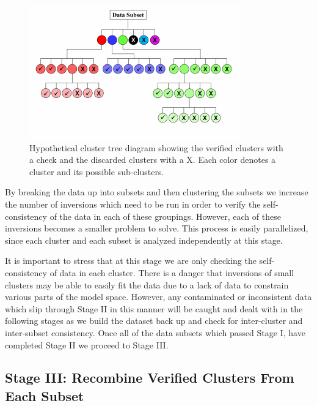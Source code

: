 \documentclass[final,authoryear,5p,times,twocolumn]{elsarticle}
\begin{document}
\begin{figure} [h!]
\begin{center}
   \includegraphics[trim=0cm 0cm 0cm 0cm, clip=true,width=0.75\linewidth]{./Figures/Fig14.pdf}     
\end{center}
\caption{Hypothetical cluster tree diagram showing the verified clusters with a check and the discarded clusters with a X. Each color denotes a cluster and its possible sub-clusters.}
\label{fig:ClusterTree}
\end{figure} 

By breaking the data up into subsets and then clustering the subsets we increase the number of inversions which need to be run in order to verify the self-consistency of the data in each of these groupings. However, each of these inversions becomes a smaller problem to solve. This process is easily parallelized, since each cluster and each subset is analyzed independently at this stage. 

It is important to stress that at this stage we are only checking the self-consistency of data in each cluster. There is a danger that inversions of small clusters may be able to easily fit the data due to a lack of data to constrain various parts of the model space. However, any contaminated or inconsistent data which slip through Stage II in this manner will be caught and dealt with in the following stages as we build the dataset back up and check for inter-cluster and inter-subset consistency. Once all of the data subsets which passed Stage I, have completed Stage II we proceed to Stage III.

\subsection{Stage III: Recombine Verified Clusters From Each Subset}
\label{Data_Quality_Control:StageIII_Recombine_Clusters}
\end{document}
